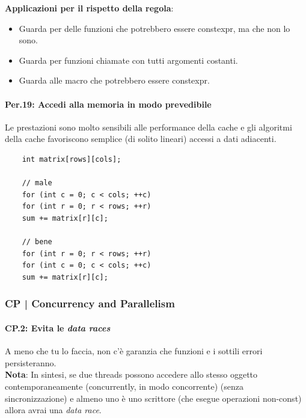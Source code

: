 \textsf{\small \textbf{Applicazioni per il rispetto della regola}: }

\begin{itemize}
	\item \textsf{\small Guarda per delle funzioni che potrebbero essere constexpr, ma che non lo sono.}
	\item \textsf{\small Guarda per funzioni chiamate con tutti argomenti costanti.}
	\item \textsf{\small Guarda alle macro che potrebbero essere constexpr.}
\end{itemize}

\paragraph{Per.19: Accedi alla memoria in modo prevedibile}

\label{Per_19}

\textsf{\small Le prestazioni sono molto sensibili alle performance della cache e gli algoritmi della cache favoriscono semplice (di solito lineari) accessi a dati adiacenti.} \\

\begin{lstlisting}
	int matrix[rows][cols];
	
	// male
	for (int c = 0; c < cols; ++c)
	for (int r = 0; r < rows; ++r)
	sum += matrix[r][c];
	
	// bene
	for (int r = 0; r < rows; ++r)
	for (int c = 0; c < cols; ++c)
	sum += matrix[r][c];
\end{lstlisting}


\subsubsection{CP | Concurrency and Parallelism}

\paragraph{CP.2: Evita le \emph{data races}}

\textsf{\small A meno che tu lo faccia, non c'è garanzia che funzioni e i sottili errori persisteranno.} \\

\textsf{\small \textbf{Nota}: In sintesi, se due threads possono accedere allo stesso oggetto contemporaneamente (concurrently, in modo concorrente) (senza sincronizzazione) e almeno uno è uno scrittore (che esegue operazioni non-const) allora avrai una \emph{data race}. } \\

